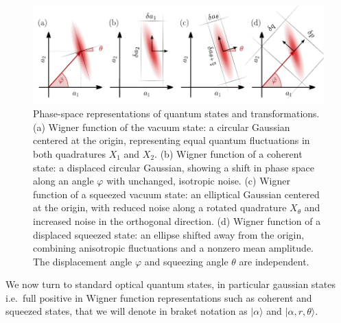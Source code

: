 \begin{figure}
\centering
\includegraphics[width=\textwidth]{./chap2/fig/quantum_quadraturesBis.pdf}
\caption{Phase-space representations of quantum states and transformations.
(a) Wigner function of the vacuum state: a circular Gaussian centered at the origin, representing equal quantum fluctuations in both quadratures $X_1$ and $X_2$.
(b) Wigner function of a coherent state: a displaced circular Gaussian, showing a shift in phase space along an angle $\varphi$ with unchanged, isotropic noise.
(c) Wigner function of a squeezed vacuum state: an elliptical Gaussian centered at the origin, with reduced noise along a rotated quadrature $X_\theta$ and increased noise in the orthogonal direction.
(d) Wigner function of a displaced squeezed state: an ellipse shifted away from the origin, combining anisotropic fluctuations and a nonzero mean amplitude. The displacement angle $\varphi$ and squeezing angle $\theta$ are independent.} 
\end{figure}


We now turn to standard optical quantum states, in particular gaussian states i.e.\ full positive in Wigner function representations such as coherent and squeezed states, that we will denote in braket notation as $|\alpha\rangle$ and $|\alpha,r, \theta\rangle $.

